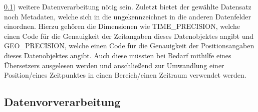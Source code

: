 \documentclass[usegeometry=true]{scrartcl}
\begin{document}
\ref{sec:datenvorverarbeitung}) weitere Datenverarbeitung nötig sein. Zuletzt bietet der gewählte Datensatz noch Metadaten, welche sich in die ungekennzeichnet in die anderen Datenfelder einordnen. Hierzu gehören die Dimensionen wie TIME\_PRECISION, welche einen Code für die Genauigkeit der Zeitangaben dieses Datenobjektes angibt und GEO\_PRECISION, welche einen Code für die Genauigkeit der Positionsangaben dieses Datenobjektes angibt. Auch diese müssten bei Bedarf mithilfe eines Übersetzers ausgelesen werden und anschließend zur Umwandlung einer Position/eines Zeitpunktes in einen Bereich/einen Zeitraum verwendet werden.\\

\subsection{Datenvorverarbeitung} \label{sec:datenvorverarbeitung}
\end{document}
